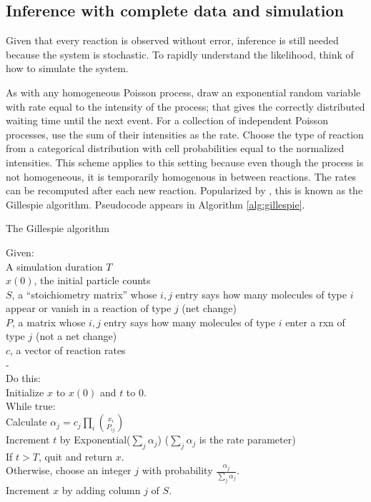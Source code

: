 \documentclass{article}
\begin{document}
\subsection{Inference with complete data and simulation}
Given that every reaction is observed without error, inference is still needed because the system is stochastic. To rapidly understand the likelihood, think of how to simulate the system.

As with any homogeneous Poisson process, draw an exponential random variable with rate equal to the intensity of the process; that gives the correctly distributed waiting time until the next event. For a collection of independent Poisson processes, use the sum of their intensities as the rate. Choose the type of reaction from a categorical distribution with cell probabilities equal to the normalized intensities. This scheme applies to this setting because even though the process is not homogeneous, it is temporarily homogenous in between reactions. The rates can be recomputed after each new reaction. Popularized by  \cite{gillespie1977}, this is known as the Gillespie algorithm. Pseudocode appears in Algorithm \ref{alg:gillespie}.


\begin{algorithm}[h]
\caption{The Gillespie algorithm \label{alg:gillespie}}
Given:\\
\Indp
A simulation duration $T$\\
$x(0)$, the initial particle counts\\
$S$, a ``stoichiometry matrix'' whose $i,j$ entry says how many molecules of type $i$ appear or vanish in a reaction of type $j$ (net change)\\
$P$, a matrix whose $i,j$ entry says how many molecules of type $i$ enter a rxn of type $j$ (not a net change)\\
$c$, a vector of reaction rates\\
-\\
\Indm
Do this:\\
\Indp
Initialize $x$ to $x(0)$ and $t$ to 0.\\
While true:\\
\Indp
Calculate $\alpha_j = c_j\prod_i {x_i\choose P_{ij}}$\\
Increment $t$ by Exponential($\sum_j \alpha_j$) ($\sum_j \alpha_j$ is the rate parameter)\\
If $t > T$, quit and return $x$.\\
Otherwise, choose an integer $j$ with probability $\frac{\alpha_j}{\sum_j \alpha_j}$.\\
Increment $x$ by adding column $j$ of $S$.\\
\end{algorithm}
\end{document}
